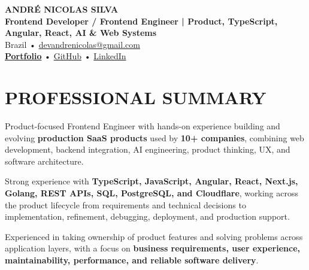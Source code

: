 \documentclass[10pt,a4paper]{article}
\begin{document}

\begin{center}

    {\LARGE \textbf{ANDRÉ NICOLAS SILVA}} \\[-2pt]

    {\normalsize \textbf{Frontend Developer / Frontend Engineer | Product, TypeScript, Angular, React, AI \& Web Systems}} \\[1pt]

    \footnotesize
    Brazil \quad • \quad
    \href{mailto:devandrenicolas@gmail.com}{devandrenicolas@gmail.com} \\[-1pt]

    \textbf{\href{https://portfolio-andrenicolas.vercel.app}{Portfolio}}
    \quad • \quad
    \href{https://github.com/devAndreNicolas}{GitHub}
    \quad • \quad
    \href{https://www.linkedin.com/in/devandrenicolas}{LinkedIn}

\end{center}

\vspace{-3pt}


\section*{PROFESSIONAL SUMMARY}

\footnotesize

Product-focused Frontend Engineer with hands-on experience building and
evolving \textbf{production SaaS products} used by \textbf{10+ companies},
combining web development, backend integration, AI engineering,
product thinking, UX, and software architecture.

Strong experience with \textbf{TypeScript, JavaScript, Angular, React,
Next.js, Golang, REST APIs, SQL, PostgreSQL, and Cloudflare},
working across the product lifecycle from requirements and technical
decisions to implementation, refinement, debugging, deployment,
and production support.

Experienced in taking ownership of product features and solving
problems across application layers, with a focus on
\textbf{business requirements, user experience, maintainability,
performance, and reliable software delivery}.
\end{document}
